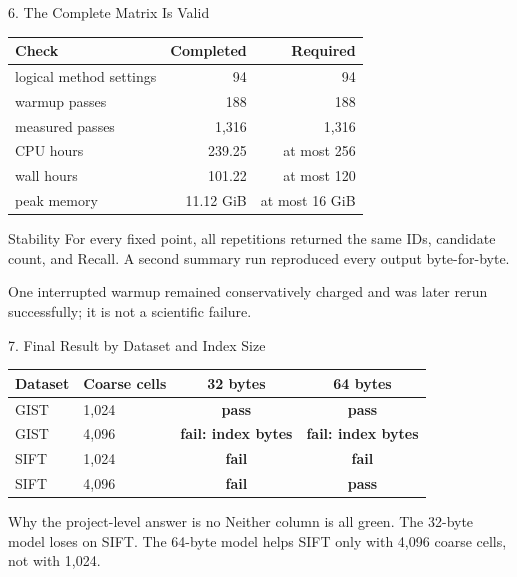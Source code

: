 \documentclass[aspectratio=169]{beamer}
\newcommand{\good}[1]{\textcolor{green!45!black}{\textbf{#1}}}
\newcommand{\bad}[1]{\textcolor{red!75!black}{\textbf{#1}}}
\begin{document}
\begin{frame}{6. The Complete Matrix Is Valid}
\begin{center}
\begin{tabular}{lrr}
\toprule
Check & Completed & Required\\
\midrule
logical method settings & 94 & 94\\
warmup passes & 188 & 188\\
measured passes & 1,316 & 1,316\\
CPU hours & 239.25 & at most 256\\
wall hours & 101.22 & at most 120\\
peak memory & 11.12 GiB & at most 16 GiB\\
\bottomrule
\end{tabular}
\end{center}
\begin{block}{Stability}
For every fixed point, all repetitions returned the same IDs, candidate count,
and Recall. A second summary run reproduced every output byte-for-byte.
\end{block}
\scriptsize One interrupted warmup remained conservatively charged and was
later rerun successfully; it is not a scientific failure.
\end{frame}

\begin{frame}{7. Final Result by Dataset and Index Size}
\small
\begin{center}
\begin{tabular}{llcc}
\toprule
Dataset & Coarse cells & 32 bytes & 64 bytes\\
\midrule
GIST & 1,024 & \good{pass} & \good{pass}\\
GIST & 4,096 & \bad{fail: index bytes} & \bad{fail: index bytes}\\
SIFT & 1,024 & \bad{fail} & \bad{fail}\\
SIFT & 4,096 & \bad{fail} & \good{pass}\\
\bottomrule
\end{tabular}
\end{center}
\normalsize
\begin{alertblock}{Why the project-level answer is no}
Neither column is all green. The 32-byte model loses on SIFT. The 64-byte
model helps SIFT only with 4,096 coarse cells, not with 1,024.
\end{alertblock}
\end{frame}
\end{document}
